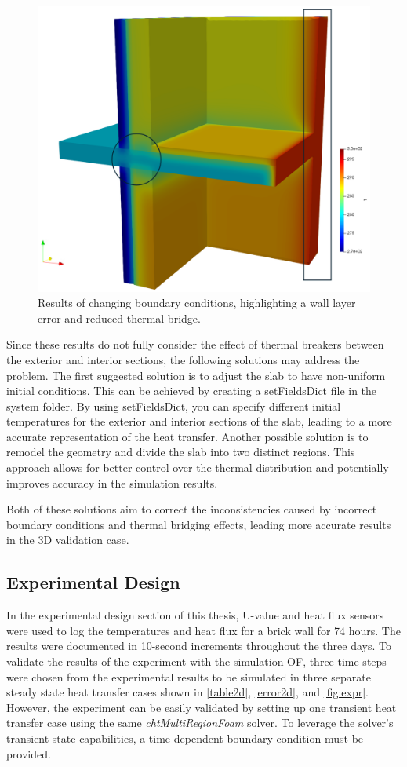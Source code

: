 
\begin{figure}[htb]
\centering
\includegraphics[width=0.75\columnwidth]{Figures/maxx.png}
\hspace{0.7cm}
\caption[Slab Validation]{Results of changing boundary conditions, highlighting a wall layer error and reduced thermal bridge.}
\label{maxx}
\end{figure}

Since these results do not fully consider the effect of thermal breakers between the exterior and interior sections, the following solutions may address the problem. The first suggested solution is to adjust the slab to have non-uniform initial conditions. This can be achieved by creating a setFieldsDict file in the system folder. By using setFieldsDict, you can specify different initial temperatures for the exterior and interior sections of the slab, leading to a more accurate representation of the heat transfer. Another possible solution is to remodel the geometry and divide the slab into two distinct regions. This approach allows for better control over the thermal distribution and potentially improves accuracy in the simulation results.

Both of these solutions aim to correct the inconsistencies caused by incorrect boundary conditions and thermal bridging effects, leading more accurate results in the 3D validation case.

\subsection{Experimental Design}
In the experimental design section of this thesis, U-value and heat flux sensors were used to log the temperatures and heat flux for a brick wall for 74 hours. The results were documented in 10-second increments throughout the three days. To validate the results of the experiment with the simulation \gls{OF}, three time steps were chosen from the experimental results to be simulated in three separate steady state heat transfer cases shown in \ref{table2d}, \ref{error2d}, and \ref{fig:expr}. However, the experiment can be easily validated by setting up one transient heat transfer case using the same \textit{chtMultiRegionFoam} solver. To leverage the solver's transient state capabilities, a time-dependent boundary condition must be provided. 


